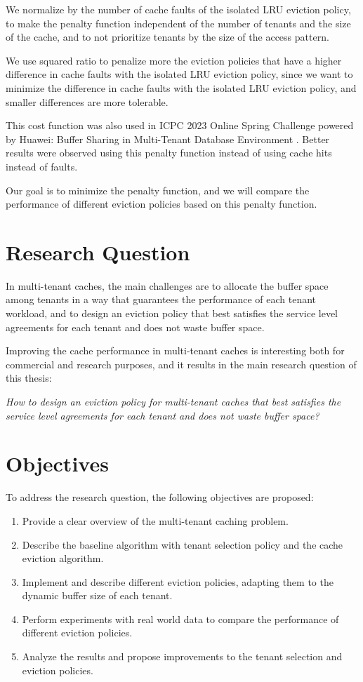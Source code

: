 We normalize by the number of cache faults of the isolated LRU eviction policy, to make 
the penalty function independent of the number of tenants and the size of the cache, and to 
not prioritize tenants by the size of the access pattern.

We use squared ratio to penalize more the eviction policies that have a higher difference
in cache faults with the isolated LRU eviction policy, since we want to minimize the
difference in cache faults with the isolated LRU eviction policy, and smaller differences
are more tolerable.

This cost function was also used in ICPC 2023 Online Spring Challenge powered by Huawei: 
Buffer Sharing in Multi-Tenant Database Environment \cite{huawei-challenge}. Better results
were observed using this penalty function instead of using cache hits instead of faults.

Our goal is to minimize the penalty function, and we will compare the performance of
different eviction policies based on this penalty function.

\section{Research Question}

In multi-tenant caches, the main challenges are to allocate the buffer space among tenants
in a way that guarantees the performance of each tenant workload, and to design an eviction
policy that best satisfies the service level agreements for each tenant and does not waste
buffer space. 

Improving the cache performance in multi-tenant caches is interesting both for commercial
and research purposes, and it results in the main research question of this thesis:

\textit{How to design an eviction policy for multi-tenant caches that best satisfies 
the service level agreements for each tenant and does not waste buffer space?}

\section{Objectives}

To address the research question, the following objectives are proposed:

\begin{enumerate}
    \item Provide a clear overview of the multi-tenant caching problem.
    \item Describe the baseline algorithm with tenant selection policy and the cache eviction algorithm.
    \item Implement and describe different eviction policies, adapting them to the dynamic buffer size of each tenant.
    \item Perform experiments with real world data to compare the performance of different eviction policies.
    \item Analyze the results and propose improvements to the tenant selection and eviction policies.
\end{enumerate}

